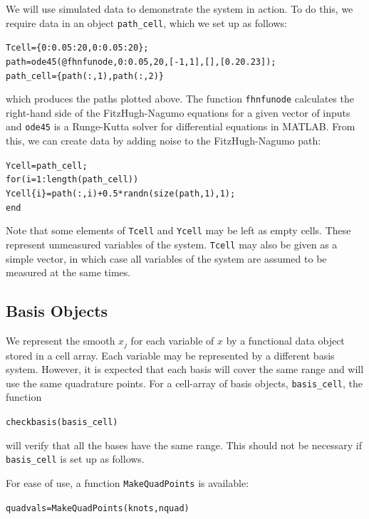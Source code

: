 \documentclass{article}
\newcommand{\nt}    {\noindent}
\begin{document}
\nt We will use simulated data to demonstrate the system in action. To do this, we require data in
an object {\tt path\_cell}, which we set up as follows:

\begin{alltt}
    Tcell = \{0:0.05:20, 0:0.05:20\};
    path = ode45(@fhnfunode,0:0.05,20,[-1,1],[],[0.2 0.2 3]);
    path_cell = \{path(:,1), path(:,2)\}
\end{alltt}

\nt which produces the paths plotted above.  The function
{\tt fhnfunode} calculates the right-hand side of the
FitzHugh-Nagumo equations for a given vector of inputs and
{\tt ode45} is a Runge-Kutta solver for differential
equations in MATLAB. From this, we can create data by
adding noise to the FitzHugh-Nagumo path:

\begin{alltt}
  Ycell = path_cell;
  for(i = 1:length(path_cell))
    Ycell\{i\} = path(:,i) + 0.5*randn(size(path,1),1);
  end
\end{alltt}

Note that some elements of {\tt Tcell} and {\tt Ycell} may be left as empty cells. These represent
unmeasured variables of the system. {\tt Tcell} may also be given as a simple vector, in which case
all variables of the system are assumed to be measured at the same times.


\subsection{Basis Objects} \label{fd_objs}

We represent the smooth $x_j$ for each variable of $x$ by a functional data object stored in a cell
array. Each variable may be represented by a different basis system. However, it is expected that
each basis will cover the same range and will use the same quadrature points. For a cell-array of
basis objects, {\tt basis\_cell}, the function

\begin{alltt}
   checkbasis(basis_cell)
\end{alltt}

\nt will verify that all the bases have the same range.
This should not be necessary if {\tt basis\_cell} is set up as
follows.

For ease of use, a function {\tt MakeQuadPoints} is available:

\begin{alltt}
   quadvals = MakeQuadPoints(knots,nquad)
\end{alltt}
\end{document}
